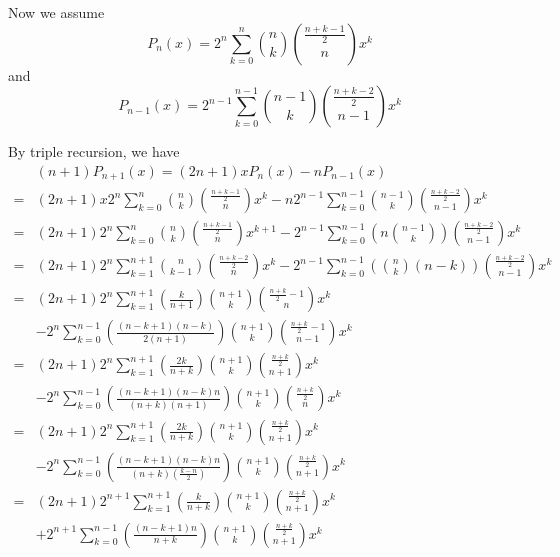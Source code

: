 \documentclass{article}
\begin{document}
Now we assume $$ P_n (x) = 2^n \sum_{k=0}^n \binom{n}{k} \binom{\frac{n+k-1}{2}}{n} x^k$$
and
$$ P_{n-1} (x) = 2^{n-1} \sum_{k=0}^{n-1} \binom{n-1}{k} \binom{\frac{n+k-2}{2}}{n-1} x^k$$

By triple recursion, we have
\begin{equation}
  \begin{split}
    &   (n+1)P_{n+1}(x) = (2n+1) x P_n (x) - n P_{n-1}(x)\\
    =& (2n+1) x  2^n \sum_{k=0}^n \binom{n}{k} \binom{\frac{n+k-1}{2}}{n} x^k - n 2^{n-1} \sum_{k=0}^{n-1} \binom{n-1}{k} \binom{\frac{n+k-2}{2}}{n-1} x^k\\
    =& (2n+1) 2^n \sum_{k=0}^n \binom{n}{k} \binom{\frac{n+k-1}{2}}{n} x^{k+1} - 2^{n-1} \sum_{k=0}^{n-1} \left( n\binom{n-1}{k}\right) \binom{\frac{n+k-2}{2}}{n-1} x^k\\
    =& (2n+1) 2^n \sum_{k=1}^{n+1} \binom{n}{k-1} \binom{\frac{n+k-2}{2}}{n} x^{k} - 2^{n-1} \sum_{k=0}^{n-1} \left( \binom{n}{k} (n-k)\right) \binom{\frac{n+k-2}{2}}{n-1} x^k\\
    =& (2n+1) 2^n \sum_{k=1}^{n+1} \left( \frac{k}{n+1} \right) \binom{n+1}{k} \binom{\frac{n+k}{2}-1}{n} x^{k}\\
    &- 2^{n}  \sum_{k=0}^{n-1}  \left(  \frac{(n-k+1)(n-k)}{2 (n+1)}\right) \binom{n+1}{k}   \binom{\frac{n+k}{2} - 1}{n-1} x^k\\
    =& (2n+1) 2^n \sum_{k=1}^{n+1} \left( \frac{ 2 k}{n+k} \right) \binom{n+1}{k} \binom{\frac{n+k}{2}}{n+1} x^{k}\\
    &- 2^{n}  \sum_{k=0}^{n-1}  \left(  \frac{(n-k+1)(n-k)n }{ (n+k) (n+1)}\right)  \binom{n+1}{k}   \binom{\frac{n+k}{2}}{n} x^k\\
    =& (2n+1) 2^n \sum_{k=1}^{n+1} \left( \frac{ 2 k}{n+k} \right) \binom{n+1}{k} \binom{\frac{n+k}{2}}{n+1} x^{k}\\
    &- 2^{n}  \sum_{k=0}^{n-1}  \left(  \frac{(n-k+1)(n-k)n }{ (n+k) (\frac{k-n}{2})}\right)  \binom{n+1}{k}   \binom{\frac{n+k}{2}}{n+1} x^k\\
    =& (2n+1) 2^{n+1} \sum_{k=1}^{n+1} \left( \frac{k}{n+k} \right) \binom{n+1}{k} \binom{\frac{n+k}{2}}{n+1} x^{k}\\
    &+ 2^{n+1}  \sum_{k=0}^{n-1}  \left(  \frac{(n-k+1)n }{n+k}\right)  \binom{n+1}{k}   \binom{\frac{n+k}{2}}{n+1} x^k\\
  \end{split}
\end{equation}
\end{document}
